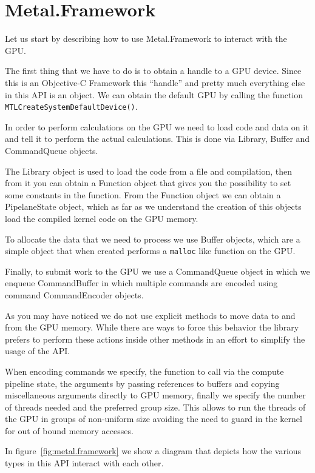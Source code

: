 \documentclass{sapthesis}
\begin{document}
\section{Metal.Framework}

Let us start by describing how to use Metal.Framework to interact with the GPU.

The first thing that we have to do is to obtain a handle to a GPU device. Since
this is an Objective-C Framework this ``handle'' and pretty much everything else
in this API is an object. We can obtain the default GPU by calling the function
\texttt{MTLCreateSystemDefaultDevice()}.

In order to perform calculations on the GPU we need to load code and data on it
and tell it to perform the actual calculations. This is done via Library, Buffer
and CommandQueue objects.

The Library object is used to load the code from a file and compilation, then from
it you can obtain a Function object that gives you the possibility to set some
constants in the function. From the Function object we can obtain a
PipelaneState object, which as far as we understand the creation of this objects
load the compiled kernel code on the GPU memory.

To allocate the data that we need to process we use Buffer objects, which are a
simple object that when created performs a \texttt{malloc} like function on the
GPU.

Finally, to submit work to the GPU we use a CommandQueue object in which we
enqueue CommandBuffer in which multiple commands are encoded using command
CommandEncoder objects.

As you may have noticed we do not use explicit methods to move data to and from
the GPU memory. While there are ways to force this behavior the library prefers
to perform these actions inside other methods in an effort to simplify the usage
of the API.

When encoding commands we specify, the function to call via the compute pipeline
state, the arguments by passing references to buffers and copying miscellaneous
arguments directly to GPU memory, finally we specify the number of threads
needed and the preferred group size. This allows to run the threads of the GPU
in groups of non-uniform size avoiding the need to guard in the kernel for out
of bound memory accesses.

In figure~\ref{fig:metal.framework} we show a diagram that depicts how the
various types in this API interact with each other.
\end{document}
